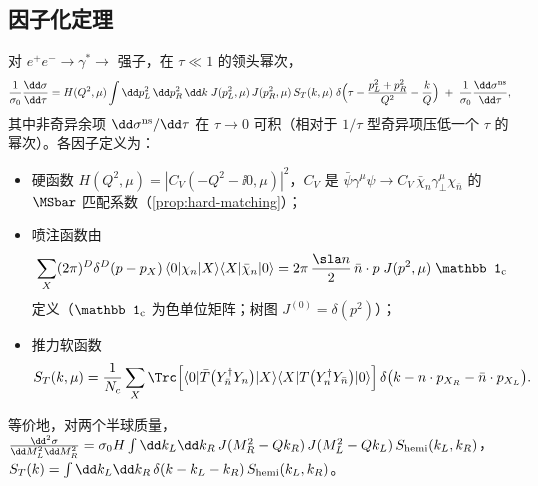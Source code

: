 \subsection{因子化定理}

\begin{theorem}[推力分布的因子化]\tagA\label{thm:thrust-factorization}
对 $e^+e^-\to\gamma^*\to$ 强子，在 $\tau\ll1$ 的领头幂次，
\begin{equation}\label{eq:thrust-fact}
\frac{1}{\sigma_0}\frac{\dd\sigma}{\dd\tau}=H(Q^2,\mu)\int\dd p_L^2\,\dd p_R^2\,\dd k\;J(p_L^2,\mu)\,J(p_R^2,\mu)\,S_T(k,\mu)\;
\delta\Big(\tau-\frac{p_L^2+p_R^2}{Q^2}-\frac{k}{Q}\Big)\;+\;\frac{1}{\sigma_0}\frac{\dd\sigma^{\rm ns}}{\dd\tau},
\end{equation}
其中非奇异余项 $\dd\sigma^{\rm ns}/\dd\tau$ 在 $\tau\to0$ 可积（相对于 $1/\tau$ 型奇异项压低一个 $\tau$ 的幂次）。各因子定义为：
\begin{itemize}
\item 硬函数 $H(Q^2,\mu)=|C_V(-Q^2-\ii0,\mu)|^2$，$C_V$ 是 $\bar\psi\gamma^\mu\psi\to C_V\,\bar\chi_n\gamma_\perp^\mu\chi_{\bar n}$ 的 $\MSbar$ 匹配系数（\cref{prop:hard-matching}）；
\item 喷注函数由
\begin{equation}\label{eq:thrust-Jdef}
\sum_X(2\pi)^D\delta^D(p-p_X)\,\langle0|\chi_n|X\rangle\langle X|\bar\chi_n|0\rangle=2\pi\,\frac{\nslash}{2}\,\bar n\cdot p\;J(p^2,\mu)\;\mathbb 1_{\rm c}
\end{equation}
定义（$\mathbb 1_{\rm c}$ 为色单位矩阵；树图 $J^{(0)}=\delta(p^2)$）；
\item 推力软函数
\begin{equation}\label{eq:thrust-Sdef}
S_T(k,\mu)=\frac{1}{N_c}\sum_{X}\Trc\Big[\langle0|\bar T\big(Y_{\bar n}^\dagger Y_n\big)|X\rangle\langle X|T\big(Y_n^\dagger Y_{\bar n}\big)|0\rangle\Big]\,
\delta\big(k-n\cdot p_{X_R}-\bar n\cdot p_{X_L}\big).
\end{equation}
\end{itemize}
等价地，对两个半球质量，
$\frac{\dd^2\sigma}{\dd M_L^2\dd M_R^2}=\sigma_0H\int\dd k_L\dd k_R\,J(M_R^2-Qk_R)\,J(M_L^2-Qk_L)\,S_{\rm hemi}(k_L,k_R)$，
$S_T(k)=\int\dd k_L\dd k_R\,\delta(k-k_L-k_R)\,S_{\rm hemi}(k_L,k_R)$。
\end{theorem}


